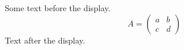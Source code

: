 \documentclass[12pt]{article}
\begin{document}
Some text before the display.
\[ A = \begin{pmatrix} a & b \\ c & d \end{pmatrix} \]
Text after the display.
\end{document}
